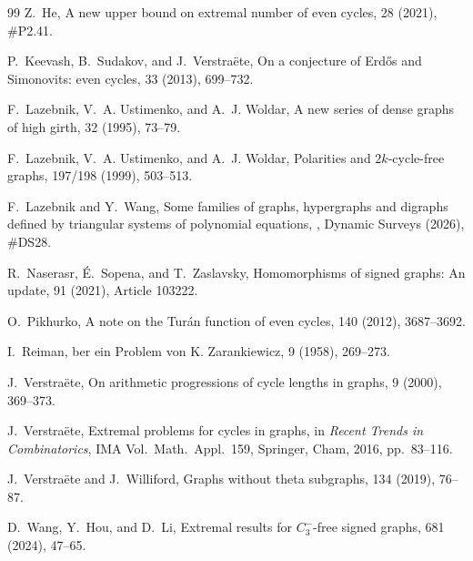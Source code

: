 \documentclass{article}
\theoremstyle{definition}
\theoremstyle{remark}
\begin{document}
\begin{thebibliography}{99}
Z.~He,
\newblock A new upper bound on extremal number of even cycles,
 28 (2021), \#P2.41.

P.~Keevash, B.~Sudakov, and J.~Verstra\"ete,
\newblock On a conjecture of Erd\H{o}s and Simonovits: even cycles,
 33 (2013), 699--732.

F.~Lazebnik, V.~A. Ustimenko, and A.~J. Woldar,
\newblock A new series of dense graphs of high girth,
 32 (1995), 73--79.

F.~Lazebnik, V.~A. Ustimenko, and A.~J. Woldar,
\newblock Polarities and $2k$-cycle-free graphs,
 197/198 (1999), 503--513.

F.~Lazebnik and Y.~Wang,
\newblock Some families of graphs, hypergraphs and digraphs defined by
triangular systems of polynomial equations,
, Dynamic Surveys
(2026), \#DS28.

R.~Naserasr, \'E.~Sopena, and T.~Zaslavsky,
\newblock Homomorphisms of signed graphs: An update,
 91 (2021), Article 103222.

O.~Pikhurko,
\newblock A note on the Tur\'an function of even cycles,
 140 (2012), 3687--3692.

I.~Reiman,
ber ein Problem von K. Zarankiewicz,
 9 (1958), 269--273.

J.~Verstra\"ete,
\newblock On arithmetic progressions of cycle lengths in graphs,
 9 (2000), 369--373.

J.~Verstra\"ete,
\newblock Extremal problems for cycles in graphs,
\newblock in {\em Recent Trends in Combinatorics}, IMA Vol.~Math.~Appl.~159,
Springer, Cham, 2016, pp.~83--116.

J.~Verstra\"ete and J.~Williford,
\newblock Graphs without theta subgraphs,
 134 (2019), 76--87.

D.~Wang, Y.~Hou, and D.~Li,
\newblock Extremal results for $C_3^-$-free signed graphs,
 681 (2024), 47--65.


\end{thebibliography}
\end{document}
